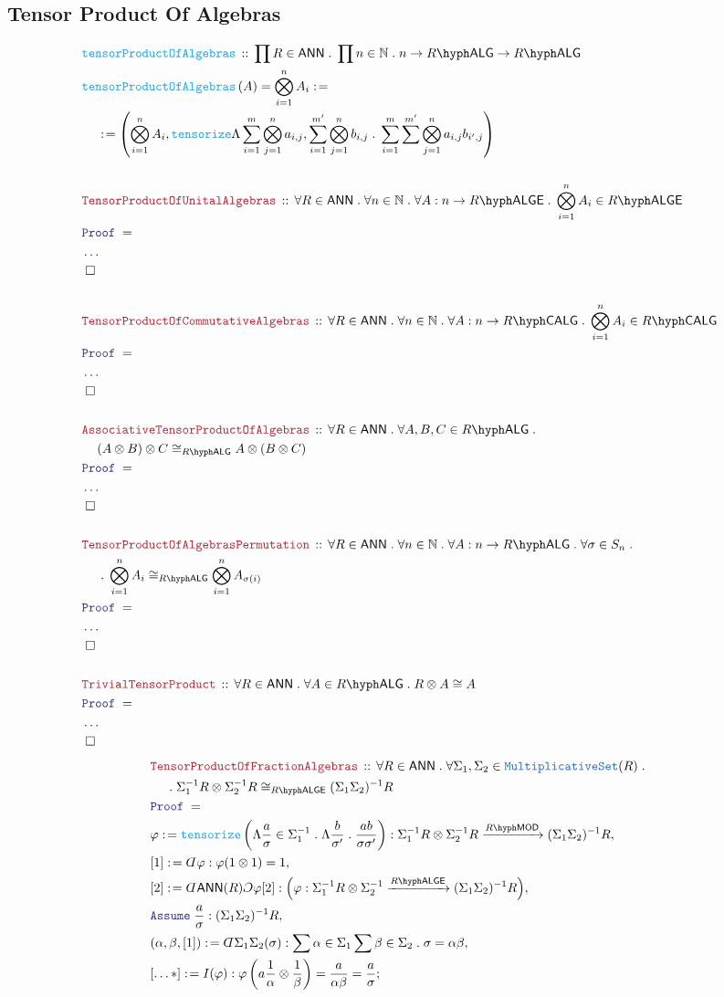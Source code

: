 \documentclass[12pt]{scrartcl}%
\newcommand{\TYPE}[1]{\textcolor{NavyBlue}{\mathtt{#1}}}%
\newcommand{\FUNC}[1]{\textcolor{Cerulean}{\mathtt{#1}}}%
\newcommand{\LOGIC}[1]{\textcolor{Blue}{\mathtt{#1}}}%
\newcommand{\THM}[1]{\textcolor{Maroon}{\mathtt{#1}}}%
\renewcommand{\.}{\; . \;} %
\newcommand{\de}{: \kern 0.1pc =} %
\newcommand{\Act}[1]{\left( #1 \right)} %
\newcommand{\Theorem}[2]{& \THM{#1} \, :: \, #2 \\ & \Proof = \\ } %
\newcommand{\DeclareFunc}[2]{& \FUNC{#1} \, :: \, #2 \\}%
\newcommand{\DefineNamedFunc}[4]{&  \FUNC{#1}\Act{#2} = #3 \de #4 \\}%
\newcommand{\NewLine}{\\ & \kern 1pc}%
\newcommand{\Page}[1]{ \begin{align*} #1 \end{align*}  }%
\newcommand{ \bd }{ \ByDef }%
\newcommand{\NoProof}{ & \ldots \\ \EndProof}%
\newcommand{\Nat}{\mathbb{N}}%
\newcommand{\Say}[3]{& #1 \de #2 : #3, \\} %
\newcommand{\Conclude}[3]{& #1 \de #2 : #3; \\}%
\newcommand{\Assume}[2]{& \LOGIC{Assume} \; #1 : #2, \\} %
\newcommand{\QED}{\; \square} %
\newcommand{\EndProof}{& \QED \\} %
\newcommand{\ByDef}{\rotatebox[origin=c]{-180}{$D$}}%
\newcommand{\ByConstr}{\rotatebox[origin=c]{-180}{$C$}}%
\newcommand{\Proof}{\LOGIC{Proof} \; } %
\newcommand{\Arrow}[1]{\xrightarrow{#1}}%
\newcommand{\LMOD}[1]{#1\hyph\mathsf{MOD}} %
\newcommand{\ANN}{\mathsf{ANN}} %
\newcommand{\LALG}[1]{#1\hyph\mathsf{ALG}}%
\newcommand{\LALGE}[1]{#1\hyph\mathsf{ALGE}}%
\newcommand{\LCALG}[1]{#1\hyph\mathsf{CALG}}%
\begin{document}
\subsection{Tensor Product Of Algebras}
\Page{
	\DeclareFunc{tensorProductOfAlgebras}{\prod R \in \ANN \.  \prod n \in \Nat \. n \to \LALG{R} \to \LALG{R} }
	\DefineNamedFunc{tensorProductOfAlgebras}{ A }{\bigotimes^n_{i=1} A_i}{\NewLine \de \left( \bigotimes^n_{i=1} A_i, 
		\FUNC{tensorize} \Lambda \sum^{m}_{i=1} \bigotimes^{n}_{j=1} a_{i,j},\sum^{m'}_{i=1} \bigotimes^n_{j=1} b_{i,j}  \. \sum^m_{i=1} \sum^{m'} \bigotimes^n_{j=1} a_{i,j}b_{i',j}  \right)}
	\\
	\Theorem{TensorProductOfUnitalAlgebras}{\forall R \in \ANN \. \forall n \in \Nat \. \forall A : n \to \LALGE{R} \. \bigotimes^n_{i=1} A_i \in \LALGE{R} }
	\NoProof
	\\
	\Theorem{TensorProductOfCommutativeAlgebras}{\forall R \in \ANN \. \forall n \in \Nat \. \forall A : n \to \LCALG{R} \. \bigotimes^n_{i=1} A_i \in \LCALG{R} }
	\NoProof
	\\
	\Theorem{AssociativeTensorProductOfAlgebras}{\forall R \in \ANN \. \forall A,B,C \in \LALG{R} \. \NewLine (A \otimes B) \otimes C \cong_{\LALG{R}} A \otimes (B \otimes C)}
	\NoProof
	\\
	\Theorem{TensorProductOfAlgebrasPermutation}{\forall R \in \ANN \.  \forall n \in \Nat \. \forall A : n \to \LALG{R} \. \forall \sigma \in S_n \. 
		\NewLine \.
		\bigotimes^n_{i=1} A_i \cong_{\LALG{R}} \bigotimes^n_{i=1} A_{\sigma(i)}
	}
	\NoProof
	\\
	\Theorem{TrivialTensorProduct}{\forall R \in \ANN \. \forall A \in \LALG{R} \. R \otimes A \cong A}
	\NoProof
}\Page{
	\Theorem{TensorProductOfFractionAlgebras}{\forall R \in \ANN \. \forall \Sigma_1,\Sigma_2 \in \TYPE{MultiplicativeSet}(R) \. \NewLine \.  \Sigma_1^{-1}R \otimes \Sigma_2^{-1}R \cong_{\LALGE{R}} (\Sigma_1\Sigma_2)^{-1}R}
	\Say{\varphi}{\FUNC{tensorize}\left(\Lambda \frac{a}{\sigma} \in \Sigma_1^{-1} \. \Lambda \frac{b}{\sigma'} \. \frac{ab}{\sigma\sigma'} \right)}
	{
		\Sigma_1^{-1}R \otimes \Sigma_2^{-1}R \Arrow{\LMOD{R}} (\Sigma_1\Sigma_2)^{-1}R
	}
	\Say{[1]}{\bd \varphi }{\varphi(1 \otimes 1) = 1}
	\Say{[2]}{\bd \ANN (R)\ByConstr \varphi [2] }{ \Big( \varphi : \Sigma_1^{-1}R \otimes \Sigma_2^{-1} \Arrow{\LALGE{R}} (\Sigma_1\Sigma_2)^{-1}R \Big) } 
	\Assume{\frac{a}{\sigma}}{(\Sigma_1\Sigma_2)^{-1}R}
	\Say{(\alpha,\beta, [1])}{\bd \Sigma_1\Sigma_2(\sigma)}{\sum \alpha \in \Sigma_1 \sum \beta \in \Sigma_2 \. \sigma = \alpha \beta}
	\Conclude{[\ldots*]}{I(\varphi)}{\varphi\left( a \frac{1}{\alpha} \otimes \frac{1}{\beta}  \right) = \frac{a}{\alpha\beta} = \frac{a}{\sigma}}
}
\end{document}
